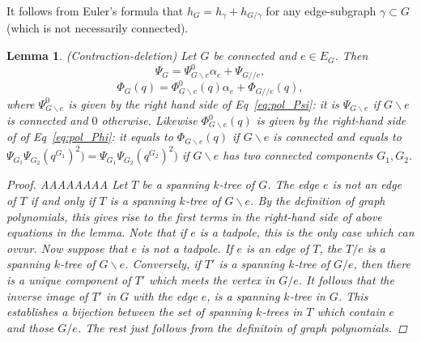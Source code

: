 \documentclass[11pt]{article}
\newtheorem{lemma}[thm]{Lemma}
\begin{document}
It follows from Euler's formula that
$h_G=h_\gamma+h_{G/\gamma}$
for any edge-subgraph $\gamma\subset G$ (which is not necessarily connected).
\begin{lemma}
(Contraction-deletion) Let $G$ be connected and $e\in E_G$. Then
$$
\Psi_G=\Psi_{G\backslash e}^0\alpha_e+\Psi_{G//e},
$$
$$
\Phi_G(q)=\Phi^0_{G\backslash e}(q)\alpha_e+\Phi_{G//e}(q),
$$
where $\Psi_{G\backslash e}^0$ is given by the right hand side of Eq~\ref{eq:pol_Psi}: it is $\Psi_{G\backslash e}$ if $G\backslash e$ is connected and $0$ otherwise. Likewise $\Phi_{G\backslash e}^0(q)$ is given by the right-hand side of of Eq~\ref{eq:pol_Phi}: it equals to $\Phi_{G\backslash e}(q)$ if $G\backslash e$ is connected and equals to $\Psi_{G_1}\Psi_{G_2}(q^{G_1})^2)=\Psi_{G_1}\Psi_{G_2}(q^{G_2})^2)$ if $G\backslash e$ has two connected components $G_1, G_2$.
\begin{proof}


AAAAAAAA
Let $T$ be a spanning $k$-tree of $G$. The edge $e$ is not an edge of $T$ if and only if $T$ is a spanning $k$-tree of $G\backslash e$. By the definition of graph polynomials, this gives rise to the first terms in the right-hand side of above equations in the lemma. Note that if $e$ is a tadpole, this is the only case which can ovvur. Now suppose that $e$ is not a tadpole. If $e$ is an edge of $T$, the $T/e$ is a spanning $k$-tree of $G\backslash e$. Conversely, if $T'$ is a spanning $k$-tree of $G/e$, then there is a unique component of $T'$ which meets the vertex in $G/e$. It follows that the inverse image of $T'$ in $G$ with the edge $e$, is a spanning $k$-tree in $G$. This establishes a bijection between the set of spanning $k$-trees in $T$ which contain $e$ and those $G/e$. The rest just follows from the definitoin of graph polynomials.
\end{proof} 
\end{lemma}
\end{document}
